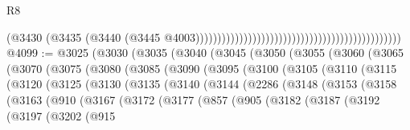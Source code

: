\begin{lexlean}{R8}
\begin{coremodule}
                                                                                          (@3430
                                                                                            (@3435
                                                                                              (@3440
                                                                                                (@3445
                                                                                                  @4003)))))))))))))))))))))))))))))))))))))))))))))))
@4099 := @3025
    (@3030
      (@3035
        (@3040
          (@3045
            (@3050
              (@3055
                (@3060
                  (@3065
                    (@3070
                      (@3075
                        (@3080
                          (@3085
                            (@3090
                              (@3095
                                (@3100
                                  (@3105
                                    (@3110
                                      (@3115
                                        (@3120
                                          (@3125
                                            (@3130
                                              (@3135
                                                (@3140
                                                  (@3144
                                                    (@2286
                                                      (@3148
                                                        (@3153
                                                          (@3158
                                                            (@3163
                                                              (@910
                                                                (@3167
                                                                  (@3172
                                                                    (@3177
                                                                      (@857
                                                                        (@905
                                                                          (@3182
                                                                            (@3187
                                                                              (@3192
                                                                                (@3197
                                                                                  (@3202
                                                                                    (@915

\end{coremodule}
\end{lexlean}
